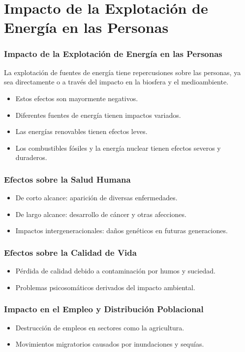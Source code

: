 \documentclass[main.tex]{subfiles}
\begin{document}
\section{Impacto de la Explotación de Energía en las Personas}
\begin{frame}
    \frametitle{Impacto de la Explotación de Energía en las Personas}
    La explotación de fuentes de energía tiene repercusiones sobre las personas, ya sea directamente o a través del impacto en la biosfera y el medioambiente.
    \begin{itemize}
        \item Estos efectos son mayormente negativos.
        \item Diferentes fuentes de energía tienen impactos variados.
        \item Las energías renovables tienen efectos leves.
        \item Los combustibles fósiles y la energía nuclear tienen efectos severos y duraderos.
    \end{itemize}
\end{frame}

\begin{frame}
    \frametitle{Efectos sobre la Salud Humana}
    \begin{itemize}
        \item De corto alcance: aparición de diversas enfermedades.
        \item De largo alcance: desarrollo de cáncer y otras afecciones.
        \item Impactos intergeneracionales: daños genéticos en futuras generaciones.
    \end{itemize}
\end{frame}

\begin{frame}
    \frametitle{Efectos sobre la Calidad de Vida}
    \begin{itemize}
        \item Pérdida de calidad debido a contaminación por humos y suciedad.
        \item Problemas psicosomáticos derivados del impacto ambiental.
    \end{itemize}
\end{frame}

\begin{frame}
    \frametitle{Impacto en el Empleo y Distribución Poblacional}
    \begin{itemize}
        \item Destrucción de empleos en sectores como la agricultura.
        \item Movimientos migratorios causados por inundaciones y sequías.
    \end{itemize}
\end{frame}
\end{document}
